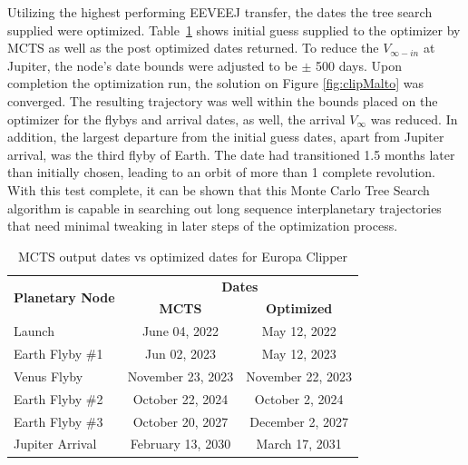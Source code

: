 \documentclass[letterpaper, preprint, paper,11pt]{AAS}	%
\begin{document}
Utilizing the highest performing EEVEEJ transfer, the dates the tree search supplied were optimized. Table~\ref*{table:clipMInputs} shows initial guess supplied to the optimizer by MCTS as well as the post optimized dates returned. To reduce the $V_{\infty-in}$ at Jupiter, the node's date bounds were adjusted to be $\pm$ 500 days. Upon completion the optimization run, the solution on Figure \ref*{fig:clipMalto} was converged. The resulting trajectory was well within the bounds placed on the optimizer for the flybys and arrival dates, as well, the arrival $V_\infty$ was reduced. In addition, the largest departure from the initial guess dates, apart from Jupiter arrival, was the third flyby of Earth. The date had transitioned 1.5 months later than initially chosen, leading to an orbit of more than 1 complete revolution. With this test complete, it can be shown that this Monte Carlo Tree Search algorithm is capable in searching out long sequence interplanetary trajectories that need minimal tweaking in later steps of the optimization process.
\begin{table}[htb]
    \begin{center}
        \caption{MCTS output dates vs optimized dates for Europa Clipper}
        \label{table:clipMInputs}
        \begin{tabular}{lcc}
            \toprule
            \multirow{2}{*}{\textbf{Planetary Node}} & \multicolumn{2}{c}{\textbf{Dates}}\\
            \cmidrule{2-3}
            {} & \textbf{MCTS} & \textbf{Optimized}\\
            \midrule
            Launch & June 04, 2022 & May 12, 2022 \\
            Earth Flyby \#1 & Jun 02, 2023 & May 12, 2023 \\
            Venus Flyby & November 23, 2023 & November 22, 2023 \\
            Earth Flyby \#2 & October 22, 2024 & October 2, 2024 \\
            Earth Flyby \#3 & October 20, 2027 & December 2, 2027 \\
            Jupiter Arrival & February 13, 2030 & March 17, 2031 \\
            \bottomrule
        \end{tabular}
    \end{center}
\end{table}
\end{document}

